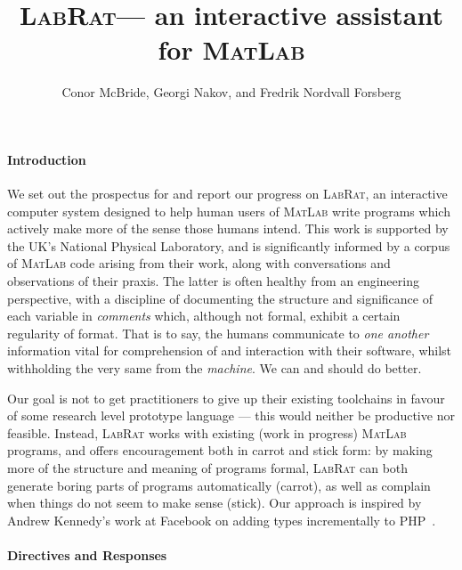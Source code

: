 \documentclass{ws-procs9x6}
\newcommand{\lr}{\textsc{LabRat}}
\newcommand{\ma}{\textsc{MatLab}}
\newcommand{\remph}{\emph}
\begin{document}
\title{\lr --- an interactive assistant for \ma}
\author{Conor McBride, Georgi Nakov, and Fredrik Nordvall Forsberg}
\address{University of Strathclyde}

\bodymatter

\paragraph{Introduction}

We set out the prospectus for and report our progress on \lr, an interactive computer system designed to help human users of \ma{} write programs which actively make more of the sense those humans intend. This work is supported by the UK's National Physical Laboratory, and is significantly informed by a corpus of \ma{} code arising from their work, along with conversations and observations of their praxis. The latter is often healthy from an engineering perspective, with a discipline of documenting the structure and significance of each variable in \remph{comments} which, although not formal, exhibit a certain regularity of format. That is to say, the humans communicate to \remph{one another} information vital for comprehension of and interaction with their software, whilst withholding the very same from the \remph{machine}. We can and should do better.


Our goal is not to get practitioners to give up their existing toolchains in favour of some research level prototype language --- this would neither be productive nor feasible. Instead, \lr{} works with existing (work in progress) \ma{} programs, and offers encouragement both in carrot and stick form: by making more of the structure and meaning of programs formal, \lr{} can both generate boring parts of programs automatically (carrot), as well as complain when things do not seem to make sense (stick). Our approach is inspired by Andrew Kennedy's work at Facebook on adding types incrementally to PHP~\cite{hack}.

\paragraph{Directives and Responses}
\end{document}
